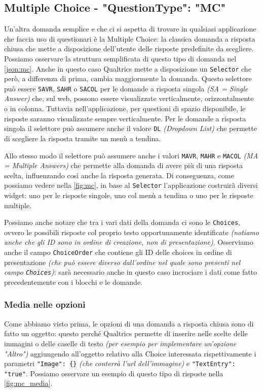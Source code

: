 \subsection{Multiple Choice - "QuestionType": "MC"}
Un'altra domanda semplice e che ci si aspetta di trovare in qualsiasi applicazione che faccia uso di questionari è la Multiple Choice: la classica domanda a risposta chiusa che mette a disposizione dell'utente delle risposte predefinite da scegliere. Possiamo osservare la struttura semplificata di questo tipo di domanda nel \autoref{json:mc}. Anche in questo caso Qualtrics mette a disposizione un \texttt{Selector} che però, a differenza di prima, cambia maggiormente la domanda. Questo selettore può essere \texttt{SAVR}, \texttt{SAHR} o \texttt{SACOL} per le domande a risposta singola \textit{(SA = Single Answer)} che, sul web, possono essere visualizzate verticalmente, orizzontalmente o in colonna. Tuttavia nell'applicazione, per questioni di spazio disponibile, le risposte saranno visualizzate sempre verticalmente. Per le domande a risposta singola il selettore può assumere anche il valore \texttt{DL} \textit{(Dropdown List)} che permette di scegliere la risposta tramite un menù a tendina.

Allo stesso modo il selettore può assumere anche i valori \texttt{MAVR}, \texttt{MAHR} e \texttt{MACOL} \textit{(MA = Multiple Answers)} che permette alla domanda di avere più di una risposta scelta, influenzando così anche la risposta generata. Di conseguenza, come possiamo vedere nella \autoref{fig:mc}, in base al \texttt{Selector} l'applicazione costruirà diversi widget: uno per le risposte singole, uno col menù a tendina o uno per le risposte multiple.

Possiamo anche notare che tra i vari dati della domanda ci sono le \texttt{Choices}, ovvero le possibili risposte col proprio testo opportunamente identificate \textit{(notiamo anche che gli ID sono in ordine di creazione, non di presentazione)}. Osserviamo anche il campo \texttt{ChoiceOrder} che contiene gli ID delle choices in ordine di presentazione \textit{(che può essere diverso dall'ordine nel quale sono presenti nel campo \texttt{Choices})}: sarà necessario anche in questo caso incrociare i dati come fatto precedentemente con i blocchi e le domande.

\subsubsection{Media nelle opzioni}
Come abbiamo visto prima, le opzioni di una domanda a risposta chiusa sono di fatto un oggetto: questo perché Qualtrics permette di inserire nelle scelte delle immagini o delle caselle di testo \textit{(per esempio per implementare un'opzione "Altro")} aggiungendo all'oggetto relativo alla Choice interessata rispettivamente i parametri \texttt{"Image": \{\}} \textit{(che conterrà l'url dell'immagine)} e \texttt{"TextEntry": "true"}.
Possiamo osservare un esempio di questo tipo di risposte nella \autoref{fig:mc_media}.

